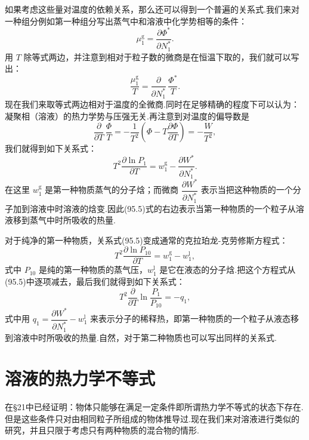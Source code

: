 如果考虑这些量对温度的依赖关系，那么还可以得到一个普遍的关系式.我们来对一种组分例如第一种组分写出蒸气中和溶液中化学势相等的条件：
\begin{equation*}
  \mu_1^{\mathrm{g}}=\frac{\partial\varPhi^{*}}{\partial N_1^{*}}.
\end{equation*}
用 $T$ 除等式两边，并注意到相对于粒子数的微商是在恒温下取的，我们就可以写出：
\begin{equation*}
  \frac{\mu_1^{\mathrm{g}}}{T}
  =\frac{\partial}{\partial N_1^{*}}\,\frac{\varPhi^{*}}{T}.
\end{equation*}
现在我们来取等式两边相对于温度的全微商.同时在足够精确的程度下可以认为：凝聚相（溶液）的热力学势与压强无关.再注意到对温度的偏导数是
\begin{equation*}
  \frac{\partial}{\partial T}\,\frac{\varPhi}{T}
  =-\frac{1}{T^2}\left(\varPhi-T\frac{\partial\varPhi}{\partial T}\right)
  =-\frac{W}{T^2},
\end{equation*}
我们就得到如下关系式：
\begin{equation}
  T^2\frac{\partial\ln P_1}{\partial T}
  =w_1^{\mathrm{g}}-\frac{\partial W^{*}}{\partial N_1^{*}}.
\end{equation}
在这里 $w_1^{\mathrm{g}}$ 是第一种物质蒸气的分子焓；而微商 $\dfrac{\partial W^{*}}{\partial N_1^{*}}$ 表示当把这种物质的一个分子加到溶液中时溶液的焓变.因此(95.5)式的右边表示当第一种物质的一个粒子从溶液移到蒸气中时所吸收的热量.

对于纯净的第一种物质，关系式(95.5)变成通常的克拉珀龙-克劳修斯方程式：
\begin{equation*}
  T^2\frac{\partial\ln P_{10}}{\partial T}
  =w_1^{\mathrm{g}}-w_1^{\mathrm{l}},
\end{equation*}
式中 $P_{10}$ 是纯的第一种物质的蒸气压，$w_1^{\mathrm{l}}$ 是它在液态的分子焓.把这个方程式从(95.5)中逐项减去，最后我们就得到如下关系式：
\begin{equation}
  T^2\frac{\partial}{\partial T}\ln\frac{P_1}{P_{10}}=-q_1,
\end{equation}
式中用 $q_1=\dfrac{\partial W^{*}}{\partial N_1^{*}}-w_1^{\mathrm{l}}$ 来表示分子的稀释热，即第一种物质的一个粒子从液态移到溶液中时所吸收的热量.自然，对于第二种物质也可以写出同样的关系式.

\section{溶液的热力学不等式}

在§21中已经证明：物体只能够在满足一定条件即所谓热力学不等式的状态下存在.但是这些条件只对由相同粒子所组成的物体推导过.现在我们来对溶液进行类似的研究，并且只限于考虑只有两种物质的混合物的情形.

